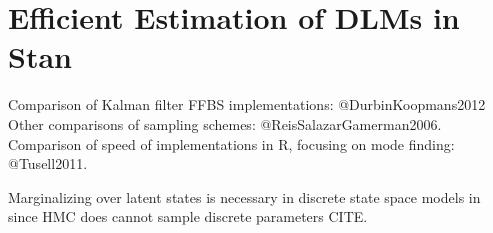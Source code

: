 \section{Efficient Estimation of DLMs in Stan}
\label{dlm:sec:effic-estim-dlms}

Comparison of Kalman filter FFBS implementations: @DurbinKoopmans2012
Other comparisons of sampling schemes: @ReisSalazarGamerman2006.
Comparison of speed of implementations in R, focusing on mode finding: @Tusell2011.


Marginalizing over latent states is necessary in discrete state space models in \Stan{} since HMC does cannot sample discrete parameters CITE.
